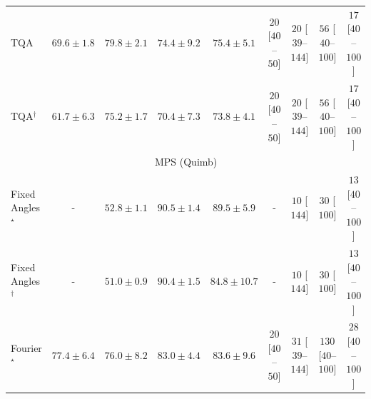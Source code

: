 \begin{tabular}{l|cccc|cccc|}
TQA & {\cellcolor[HTML]{95A8D0}} \color[HTML]{F1F1F1} $69.6\pm 1.8$ & {\cellcolor[HTML]{8A59A8}} \color[HTML]{F1F1F1} $79.8\pm 2.1$ & {\cellcolor[HTML]{8C84BD}} \color[HTML]{F1F1F1} $74.4\pm 9.2$ & {\cellcolor[HTML]{8C7CB9}} \color[HTML]{F1F1F1} $75.4\pm 5.1$ & {\cellcolor[HTML]{FFF4F0}} \color[HTML]{000000} $20$ [$40$--$50$] & {\cellcolor[HTML]{FFF4F0}} \color[HTML]{000000} $20$ [$39$--$144$] & {\cellcolor[HTML]{FEECE9}} \color[HTML]{000000} $56$ [$40$--$100$] & {\cellcolor[HTML]{FFF5F1}} \color[HTML]{000000} $17$ [$40$--$100$] \\
TQA$^\dagger$ & {\cellcolor[HTML]{BFD3E6}} \color[HTML]{000000} $61.7\pm 6.3$ & {\cellcolor[HTML]{8C7DBA}} \color[HTML]{F1F1F1} $75.2\pm 1.7$ & {\cellcolor[HTML]{92A3CD}} \color[HTML]{F1F1F1} $70.4\pm 7.3$ & {\cellcolor[HTML]{8C89C0}} \color[HTML]{F1F1F1} $73.8\pm 4.1$ & {\cellcolor[HTML]{FFF4F0}} \color[HTML]{000000} $20$ [$40$--$50$] & {\cellcolor[HTML]{FFF4F0}} \color[HTML]{000000} $20$ [$39$--$144$] & {\cellcolor[HTML]{FEECE9}} \color[HTML]{000000} $56$ [$40$--$100$] & {\cellcolor[HTML]{FFF5F1}} \color[HTML]{000000} $17$ [$40$--$100$] \\
\cline{1-9}
\multicolumn{9}{c}{\rule{0pt}{8pt}MPS (Quimb)} \\
\midrule
Fixed Angles$^\star$ & {\cellcolor[HTML]{000000}} \color[HTML]{F1F1F1} {\cellcolor{white}} \color{black} - & {\cellcolor[HTML]{FFFCD8}} \color[HTML]{000000} $52.8\pm 1.1$ & {\cellcolor[HTML]{812D05}} \color[HTML]{F1F1F1} $90.5\pm 1.4$ & {\cellcolor[HTML]{8B3005}} \color[HTML]{F1F1F1} $89.5\pm 5.9$ & {\cellcolor[HTML]{000000}} \color[HTML]{F1F1F1} {\cellcolor{white}} \color{black} - & {\cellcolor[HTML]{FFF7F3}} \color[HTML]{000000} $10$ [$144$] & {\cellcolor[HTML]{FFF2EE}} \color[HTML]{000000} $30$ [$100$] & {\cellcolor[HTML]{FFF6F2}} \color[HTML]{000000} $13$ [$40$--$100$] \\
Fixed Angles$^\dagger$ & {\cellcolor[HTML]{000000}} \color[HTML]{F1F1F1} {\cellcolor{white}} \color{black} - & {\cellcolor[HTML]{FFFFE5}} \color[HTML]{000000} $51.0\pm 0.9$ & {\cellcolor[HTML]{832D05}} \color[HTML]{F1F1F1} $90.4\pm 1.5$ & {\cellcolor[HTML]{B84203}} \color[HTML]{F1F1F1} $84.8\pm 10.7$ & {\cellcolor[HTML]{000000}} \color[HTML]{F1F1F1} {\cellcolor{white}} \color{black} - & {\cellcolor[HTML]{FFF7F3}} \color[HTML]{000000} $10$ [$144$] & {\cellcolor[HTML]{FFF2EE}} \color[HTML]{000000} $30$ [$100$] & {\cellcolor[HTML]{FFF6F2}} \color[HTML]{000000} $13$ [$40$--$100$] \\
Fourier$^\star$ & {\cellcolor[HTML]{EC7014}} \color[HTML]{F1F1F1} $77.4\pm 6.4$ & {\cellcolor[HTML]{F17C1A}} \color[HTML]{F1F1F1} $76.0\pm 8.2$ & {\cellcolor[HTML]{C94B02}} \color[HTML]{F1F1F1} $83.0\pm 4.4$ & {\cellcolor[HTML]{C44802}} \color[HTML]{F1F1F1} $83.6\pm 9.6$ & {\cellcolor[HTML]{FFF4F0}} \color[HTML]{000000} $20$ [$40$--$50$] & {\cellcolor[HTML]{FFF2EE}} \color[HTML]{000000} $31$ [$39$--$144$] & {\cellcolor[HTML]{FDDBD7}} \color[HTML]{000000} $130$ [$40$--$100$] & {\cellcolor[HTML]{FFF3EF}} \color[HTML]{000000} $28$ [$40$--$100$] \\

\end{tabular}
